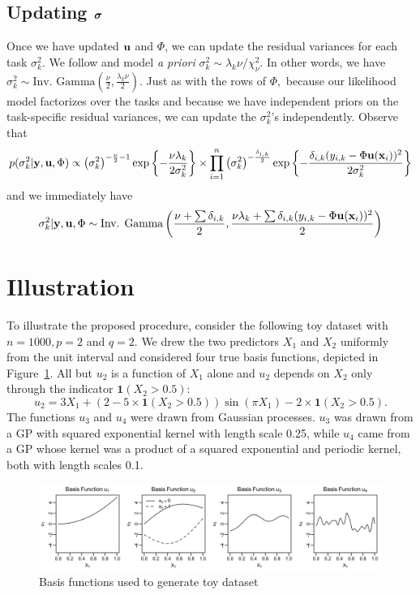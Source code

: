 \documentclass[12pt]{article}
\begin{document}
\subsection{Updating $\boldsymbol{\sigma}$}
Once we have updated $\mathbf{u}$ and $\Phi$, we can update the residual variances for each task $\sigma^{2}_{k}.$
We follow \citet{Chipman2010} and model \textit{a priori} $\sigma_{k}^{2} \sim \lambda_{k}\nu/\chi^{2}_{\nu}.$
In other words, we have $\sigma^{2}_{k} \sim \text{Inv. Gamma}\left(\frac{\nu}{2}, \frac{\lambda_{k}\nu}{2}\right).$
Just as with the rows of $\Phi,$ because our likelihood model factorizes over the tasks and because we have independent priors on the task-specific residual variances, we can update the $\sigma^{2}_{k}$'s independently.
Observe that
$$
p(\sigma^{2}_{k} | \mathbf{y}, \mathbf{u}, \Phi) \propto \left(\sigma^{2}_{k}\right)^{-\frac{\nu}{2} - 1}\exp\left\{-\frac{\nu\lambda_{k}}{2\sigma^{2}_{k}}\right\} \times \prod_{i = 1}^{n}{\left(\sigma_{k}^{2}\right)^{-\frac{\delta_{i,k}}{2}}\exp\left\{-\frac{\delta_{i,k}(y_{i,k} - \Phi\mathbf{u}(\mathbf{x}_{i}))^{2}}{2\sigma^{2}_{k}}\right\}}
$$
and we immediately have
$$
\sigma^{2}_{k} | \mathbf{y}, \mathbf{u}, \Phi \sim \text{Inv. Gamma}\left(\frac{\nu + \sum{\delta_{i,k}}}{2}, \frac{\nu\lambda_{k} + \sum{\delta_{i,k}(y_{i,k} - \Phi\mathbf{u}(\mathbf{x}_{i}))^{2}}}{2}\right)
$$


\section{Illustration}

To illustrate the proposed procedure, consider the following toy dataset with $n = 1000, p = 2$ and $q = 2.$
We drew the two predictors $X_{1}$ and $X_{2}$ uniformly from the unit interval and considered four true basis functions, depicted in Figure~\ref{fig:toy_example_basis}.
All but $u_{2}$ is a function of $X_{1}$ alone and $u_{2}$ depends on $X_{2}$ only through the indicator $\mathbf{1}(X_{2} > 0.5)$:
$$
u_{2} = 3X_{1} + (2 - 5\times\mathbf{1}(X_{2} > 0.5))\sin\left(\pi X_{1}\right) - 2\times \mathbf{1}(X_{2} > 0.5).
$$
The functions $u_{3}$ and $u_{4}$ were drawn from Gaussian processes.
$u_{3}$ was drawn from a GP with squared exponential kernel with length scale 0.25, while $u_{4}$ came from a GP whose kernel was a product of a squared exponential and periodic kernel, both with length scales 0.1.

\begin{figure}[H]
\centering
\includegraphics[width = \textwidth]{../images/toy_example_basis.png}
\caption{Basis functions used to generate toy dataset}
\label{fig:toy_example_basis}
\end{figure}
\end{document}
